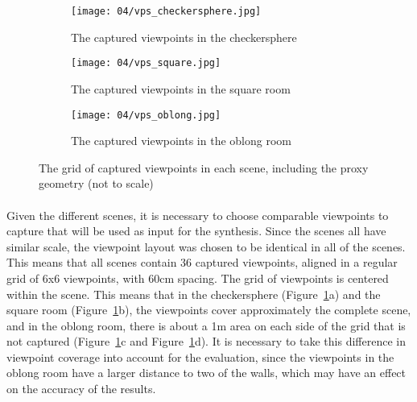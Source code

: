 \begin{figure}
\centering
    \hfill
    \begin{subfigure}[b]{0.4\textwidth}
            \centering
            \texttt{[image: 04/vps\_checkersphere.jpg]}
            \caption{The captured viewpoints in the checkersphere}
    \end{subfigure}
    \hfill
    \begin{subfigure}[b]{0.4\textwidth}
            \centering
            \texttt{[image: 04/vps\_square.jpg]}
            \caption{The captured viewpoints in the square room}
    \end{subfigure}
    \hfill
    \hfill

    \hfill
    \begin{subfigure}[b]{0.4\textwidth}
            \centering
            \texttt{[image: 04/vps\_oblong.jpg]}
            \caption{The captured viewpoints in the oblong room}
    \end{subfigure}
    \hfill
    \hfill
  \caption[The grid of captured viewpoints in each scene, including the proxy geometry]{The grid of captured viewpoints in each scene, including the proxy geometry (not to scale)} \label{fig:vps_grid}
\end{figure}

\paragraph{}
Given the different scenes, it is necessary to choose comparable viewpoints to capture that will be used as input for the synthesis. Since the scenes all have similar scale, the viewpoint layout was chosen to be identical in all of the scenes. This means that all scenes contain 36 captured viewpoints, aligned in a regular grid of 6x6 viewpoints, with 60cm spacing. The grid of viewpoints is centered within the scene. This means that in the checkersphere (Figure~\ref{fig:vps_grid}a) and the square room (Figure~\ref{fig:vps_grid}b), the viewpoints cover approximately the complete scene, and in the oblong room, there is about a 1m area on each side of the grid that is not captured (Figure~\ref{fig:vps_grid}c and Figure~\ref{fig:vps_grid}d). It is necessary to take this difference in viewpoint coverage into account for the evaluation, since the viewpoints in the oblong room have a larger distance to two of the walls, which may have an effect on the accuracy of the results.

